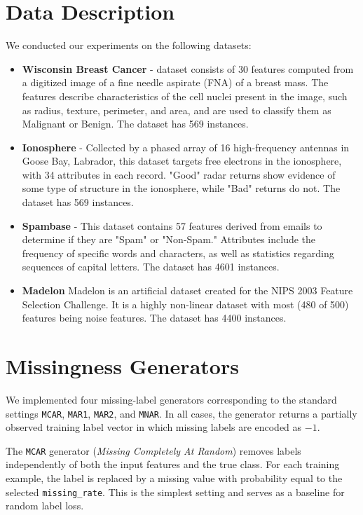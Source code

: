 \documentclass[8pt,a4paper]{extarticle}
\begin{document}
\section{Data Description}
We conducted our experiments on the following datasets:
\begin{itemize}
    \item \textbf{Wisconsin Breast Cancer} -  dataset consists of 30 features computed from a digitized image of a fine needle aspirate (FNA) of a breast mass. The features describe characteristics of the cell nuclei present in the image, such as radius, texture, perimeter, and area, and are used to classify them as Malignant or Benign. The dataset has 569 instances. 
    \item \textbf{Ionosphere} - Collected by a phased array of 16 high-frequency antennas in Goose Bay, Labrador, this dataset targets free electrons in the ionosphere, with 34 attributes in each record. "Good" radar returns show evidence of some type of structure in the ionosphere, while "Bad" returns do not. The dataset has 569 instances. 
    \item \textbf{Spambase} - This dataset contains 57 features derived from emails to determine if they are "Spam" or "Non-Spam." Attributes include the frequency of specific words and characters, as well as statistics regarding sequences of capital letters. The dataset has 4601 instances. 
    \item \textbf{Madelon}  Madelon is an artificial dataset created for the NIPS 2003 Feature Selection Challenge. It is a highly non-linear dataset with most (480 of 500) features being noise features. The dataset has 4400 instances.
\end{itemize}
\section{Missingness Generators}

We implemented four missing-label generators corresponding to the standard settings \texttt{MCAR}, \texttt{MAR1}, \texttt{MAR2}, and \texttt{MNAR}. In all cases, the generator returns a partially observed training label vector in which missing labels are encoded as $-1$.

The \texttt{MCAR} generator (\emph{Missing Completely At Random}) removes labels independently of both the input features and the true class. For each training example, the label is replaced by a missing value with probability equal to the selected \texttt{missing\_rate}. This is the simplest setting and serves as a baseline for random label loss.
\end{document}
